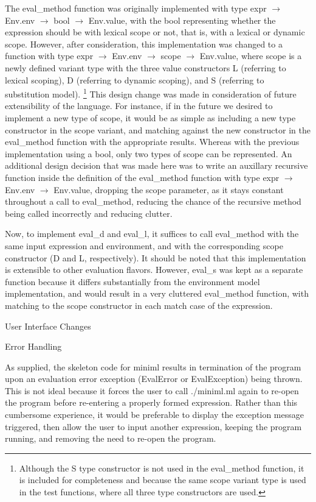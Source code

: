 \documentclass{article}
\begin{document}
The eval\_method function was originally implemented with type expr $\rightarrow$ Env.env $\rightarrow$ bool $\rightarrow$ Env.value, with the bool representing whether the expression should be with lexical scope or not, that is, with a lexical or dynamic scope. However, after consideration, this implementation was changed to a function with type expr $\rightarrow$ Env.env $\rightarrow$ scope $\rightarrow$ Env.value, where scope is a newly defined variant type with the three value constructors L (referring to lexical scoping), D (referring to dynamic scoping), and S (referring to substitution model). \footnote{Although the S type constructor is not used in the eval\_method function, it is included for completeness and because the same scope variant type is used in the test functions, where all three type constructors are used.} This design change was made in consideration of future extensibility of the language. For instance, if in the future we desired to implement a new type of scope, it would be as simple as including a new type constructor in the scope variant, and matching against the new constructor in the eval\_method function with the appropriate results. Whereas with the previous implementation using a bool, only two types of scope can be represented. An additional design decision that was made here was to write an auxillary recursive function inside the definition of the eval\_method function with type expr $\rightarrow$ Env.env $\rightarrow$ Env.value, dropping the scope parameter, as it stays constant throughout a call to eval\_method, reducing the chance of the recursive method being called incorrectly and reducing clutter.

Now, to implement eval\_d and eval\_l, it suffices to call eval\_method with the same input expression and environment, and with the corresponding scope constructor (D and L, respectively). It should be noted that this implementation is extensible to other evaluation flavors. However, eval\_s was kept as a separate function because it differs substantially from the environment model implementation, and would result in a very cluttered eval\_method function, with matching to the scope constructor in each match case of the expression.

\pagebreak

{\Large User Interface Changes \par}

{\large Error Handling \par}
As supplied, the skeleton code for miniml results in termination of the program upon an evaluation error exception (EvalError or EvalException) being thrown. This is not ideal because it forces the user to call ./miniml.ml again to re-open the program before re-entering a properly formed expression. Rather than this cumbersome experience, it would be preferable to display the exception message triggered, then allow the user to input another expression, keeping the program running, and removing the need to re-open the program.
\end{document}
